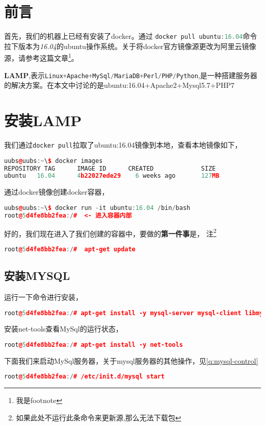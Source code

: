 \documentclass[a4]{article}
\begin{document}
\section{前言}
首先，我们的机器上已经有安装了docker。通过 \lstinline[language=C++]{docker pull ubuntu:16.04}命令拉下版本为\textit{16.04}的ubuntu操作系统。关于将docker官方镜像源更改为阿里云镜像源，请参考这篇文章\footnote{我是footnote}。

\textbf{LAMP},表示\lstinline[language=C++]{Linux+Apache+MySql/MariaDB+Perl/PHP/Python},是一种搭建服务器的解决方案。在本文中讨论的是ubuntu:16.04+Apache2+Mysql5.7+PHP7

\section{安装LAMP}
我们通过\lstinline[language=C++]{docker pull}拉取了ubuntu:16.04镜像到本地，查看本地镜像如下，
\begin{lstlisting}[language=C++]
uubs@uubs:~\$ docker images
REPOSITORY TAG      IMAGE ID      CREATED             SIZE
ubuntu   16.04      4b22027ede29    6 weeks ago       127MB
\end{lstlisting}

通过docker镜像创建docker容器，
\begin{lstlisting}[language=C++]
uubs@uubs:~\$ docker run -it ubuntu:16.04 /bin/bash 
root@5d4fe8bb2fea:/#  <- 进入容器内部
\end{lstlisting}

好的，我们现在进入了我们创建的容器中，要做的\textbf{第一件事}是， 注\footnote{如果此处不运行此条命令来更新源,那么无法下载包}
\begin{lstlisting}[language=C++]
root@5d4fe8bb2fea:/#  apt-get update
\end{lstlisting}

\subsection{安装MYSQL}
运行一下命令进行安装，
\begin{lstlisting}[language=C++]
root@5d4fe8bb2fea:/# apt-get install -y mysql-server mysql-client libmysqlclient-dev
\end{lstlisting}

安装net-tools查看MySql的运行状态，
\begin{lstlisting}[language=C++]
root@5d4fe8bb2fea:/# apt-get install -y net-tools
\end{lstlisting}

下面我们来启动MySql服务器，关于mysql服务器的其他操作，见\ref{q:mysql-control}
\begin{lstlisting}[language=C++]
root@5d4fe8bb2fea:/# /etc/init.d/mysql start
\end{lstlisting}
\end{document}
